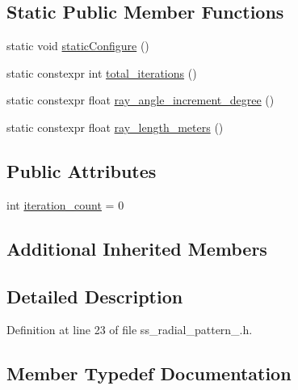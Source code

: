 \subsection*{Static Public Member Functions}
\begin{DoxyCompactItemize}
\item 
static void \hyperlink{structsm__dance__bot__3_1_1SS2_1_1SsRadialPattern2_af03f7d05eae72e178e01c38a0d478019}{static\+Configure} ()
\item 
static constexpr int \hyperlink{structsm__dance__bot__3_1_1SS2_1_1SsRadialPattern2_a5a4bca7f5c511a2b358f920c715fbdec}{total\+\_\+iterations} ()
\item 
static constexpr float \hyperlink{structsm__dance__bot__3_1_1SS2_1_1SsRadialPattern2_a3cb389428cdef48301135b562077f6aa}{ray\+\_\+angle\+\_\+increment\+\_\+degree} ()
\item 
static constexpr float \hyperlink{structsm__dance__bot__3_1_1SS2_1_1SsRadialPattern2_aad26eba03d611cdd4f842c2cf0eab644}{ray\+\_\+length\+\_\+meters} ()
\end{DoxyCompactItemize}
\subsection*{Public Attributes}
\begin{DoxyCompactItemize}
\item 
int \hyperlink{structsm__dance__bot__3_1_1SS2_1_1SsRadialPattern2_ae214d5caeae81f505b2b41e4d6427cd3}{iteration\+\_\+count} = 0
\end{DoxyCompactItemize}
\subsection*{Additional Inherited Members}


\subsection{Detailed Description}


Definition at line 23 of file ss\+\_\+radial\+\_\+pattern\+\_.\+h.



\subsection{Member Typedef Documentation}

